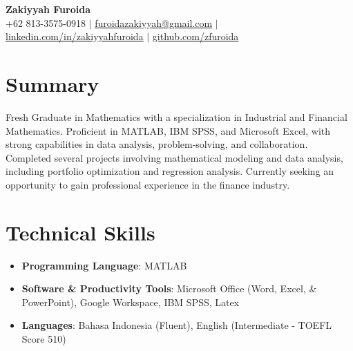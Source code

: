\documentclass[letterpaper,10pt]{article}
\newcommand{\resumeItem}[1]{\item\small{#1}}
\newcommand{\resumeSubHeadingList}{\begin{itemize}[leftmargin=0.15in, label={}]}
\newcommand{\resumeSubHeadingListEnd}{\end{itemize}}
\begin{document}
\begin{center}
  \textbf{\Huge Zakiyyah Furoida} \\
  \small +62 813-3575-0918 $|$ \href{mailto:furoidazakiyyah@gmail.com}{furoidazakiyyah@gmail.com} $|$ 
  \href{https://www.linkedin.com/in/zakiyyahfuroida/}{linkedin.com/in/zakiyyahfuroida} $|$
  \href{https://github.com/zfuroida}{github.com/zfuroida}
\end{center}

\section*{Summary}
Fresh Graduate in Mathematics with a specialization in Industrial and Financial Mathematics. Proficient in MATLAB, IBM SPSS, and Microsoft Excel, with strong capabilities in data analysis, problem-solving, and collaboration. Completed several projects involving mathematical modeling and data analysis, including portfolio optimization and regression analysis. Currently seeking an opportunity to gain professional experience in the finance industry.

\section{Technical Skills}
\resumeSubHeadingList
  \resumeItem{\textbf{Programming Language}: MATLAB}
  \resumeItem{\textbf{Software \& Productivity Tools}: Microsoft Office (Word, Excel, \& PowerPoint), Google Workspace, IBM SPSS, Latex}
  \resumeItem{\textbf{Languages}: Bahasa Indonesia (Fluent), English (Intermediate - TOEFL Score 510)}
\resumeSubHeadingListEnd
\end{document}
